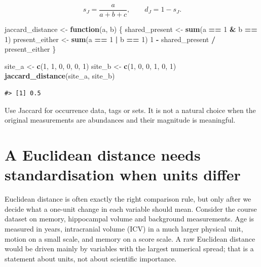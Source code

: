 \documentclass[
  english,
]{article}
\newenvironment{Shaded}{\begin{snugshade}}{\end{snugshade}}
\newcommand{\ControlFlowTok}[1]{\textcolor[rgb]{0.13,0.29,0.53}{\textbf{#1}}}
\newcommand{\DecValTok}[1]{\textcolor[rgb]{0.00,0.00,0.81}{#1}}
\newcommand{\FunctionTok}[1]{\textcolor[rgb]{0.13,0.29,0.53}{\textbf{#1}}}
\newcommand{\NormalTok}[1]{#1}
\newcommand{\OtherTok}[1]{\textcolor[rgb]{0.56,0.35,0.01}{#1}}
\newcommand{\SpecialCharTok}[1]{\textcolor[rgb]{0.81,0.36,0.00}{\textbf{#1}}}
\begin{document}
\[s_J=\frac{a}{a+b+c},\qquad d_J=1-s_J.\]

\begin{Shaded}
\begin{Highlighting}[]
\NormalTok{jaccard\_distance }\OtherTok{\textless{}{-}} \ControlFlowTok{function}\NormalTok{(a, b) \{}
\NormalTok{  shared\_present }\OtherTok{\textless{}{-}} \FunctionTok{sum}\NormalTok{(a }\SpecialCharTok{==} \DecValTok{1} \SpecialCharTok{\&}\NormalTok{ b }\SpecialCharTok{==} \DecValTok{1}\NormalTok{)}
\NormalTok{  present\_either }\OtherTok{\textless{}{-}} \FunctionTok{sum}\NormalTok{(a }\SpecialCharTok{==} \DecValTok{1} \SpecialCharTok{|}\NormalTok{ b }\SpecialCharTok{==} \DecValTok{1}\NormalTok{)}
  \DecValTok{1} \SpecialCharTok{{-}}\NormalTok{ shared\_present }\SpecialCharTok{/}\NormalTok{ present\_either}
\NormalTok{\}}

\NormalTok{site\_a }\OtherTok{\textless{}{-}} \FunctionTok{c}\NormalTok{(}\DecValTok{1}\NormalTok{, }\DecValTok{1}\NormalTok{, }\DecValTok{0}\NormalTok{, }\DecValTok{0}\NormalTok{, }\DecValTok{0}\NormalTok{, }\DecValTok{1}\NormalTok{)}
\NormalTok{site\_b }\OtherTok{\textless{}{-}} \FunctionTok{c}\NormalTok{(}\DecValTok{1}\NormalTok{, }\DecValTok{0}\NormalTok{, }\DecValTok{0}\NormalTok{, }\DecValTok{1}\NormalTok{, }\DecValTok{0}\NormalTok{, }\DecValTok{1}\NormalTok{)}
\FunctionTok{jaccard\_distance}\NormalTok{(site\_a, site\_b)}
\end{Highlighting}
\end{Shaded}

\begin{verbatim}
#> [1] 0.5
\end{verbatim}

Use Jaccard for occurrence data, tags or sets. It is not a natural
choice when the original measurements are abundances and their magnitude
is meaningful.

\section{A Euclidean distance needs standardisation when units
differ}\label{a-euclidean-distance-needs-standardisation-when-units-differ}

Euclidean distance is often exactly the right comparison rule, but only
after we decide what a one-unit change in each variable should mean.
Consider the course dataset on memory, hippocampal volume and background
measurements. Age is measured in years, intracranial volume (ICV) in a
much larger physical unit, motion on a small scale, and memory on a
score scale. A raw Euclidean distance would be driven mainly by
variables with the largest numerical spread; that is a statement about
units, not about scientific importance.
\end{document}
